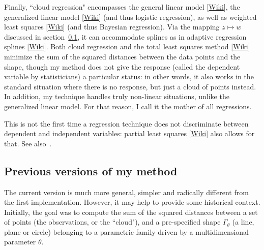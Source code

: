 \documentclass[oneside,10pt]{book}
\begin{document}
Finally, ``cloud regression" encompasses the \textcolor{index}{general linear model} [\href{https://en.wikipedia.org/wiki/General_linear_model}{Wiki}],
the \textcolor{index}{generalized linear model} [\href{https://en.wikipedia.org/wiki/Generalized_linear_model}{Wiki}] (and thus logistic regression),
 as well as \textcolor{index}{weighted least squares} [\href{https://en.wikipedia.org/wiki/Generalized_least_squares#Weighted_least_squares}{Wiki}]
 (and thus Bayesian regression). Via the mapping $z\mapsto w$ discussed in section~\ref{prevmeth}, it can accommodate splines as in
\textcolor{index}{adaptive regression splines} [\href{https://en.wikipedia.org/wiki/Multivariate_adaptive_regression_spline}{Wiki}].
 Both cloud regression and the \textcolor{index}{total least squares} method [\href{https://en.wikipedia.org/wiki/Total_least_squares}{Wiki}]  minimize the sum of the squared distances between the data points and the shape, though my method does not give the  response (called
 the dependent variable by statisticians) a particular status: in other words, it also works in the standard situation where there is no response, but just a cloud of points instead.
 In addition, my technique handles truly non-linear situations, unlike the generalized linear model. For that reason, I call it the mother of all regressions.

This is not the first time a regression technique does not discriminate between dependent and independent variables: \textcolor{index}{partial least squares} [\href{https://en.wikipedia.org/wiki/Partial_least_squares_regression}{Wiki}]
  also allows for that.  See also~\cite{fit2015}.


\subsection{Previous versions of my method}\label{prevmeth}\label{mapmp}

The current version is much more general, simpler and radically different from the first implementation. However, it may help to provide
 some historical context. Initially, the goal was to compute the sum of the squared distances between a set of points (the observations, or the ``cloud"), and
 a pre-specified shape $\Gamma_\theta$ (a line, plane or circle) belonging to a parametric family driven by a multidimensional parameter $\theta$.
\end{document}
